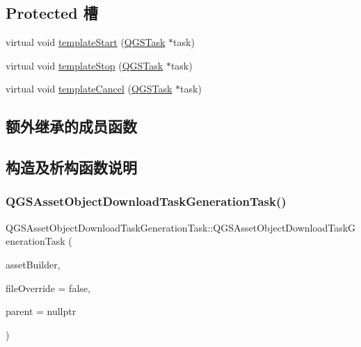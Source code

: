 \subsection*{Protected 槽}
\begin{DoxyCompactItemize}
\item 
virtual void \mbox{\hyperlink{class_q_g_s_asset_object_download_task_generation_task_a87ab572bd8b6f20986871b76418e6d20}{template\+Start}} (\mbox{\hyperlink{class_q_g_s_task}{Q\+G\+S\+Task}} $\ast$task)
\item 
virtual void \mbox{\hyperlink{class_q_g_s_asset_object_download_task_generation_task_ac7c64f2aa05cb50df9a5c50bbc0b5ee7}{template\+Stop}} (\mbox{\hyperlink{class_q_g_s_task}{Q\+G\+S\+Task}} $\ast$task)
\item 
virtual void \mbox{\hyperlink{class_q_g_s_asset_object_download_task_generation_task_a93b38002193f0cb1258de92b6492ce7f}{template\+Cancel}} (\mbox{\hyperlink{class_q_g_s_task}{Q\+G\+S\+Task}} $\ast$task)
\end{DoxyCompactItemize}
\subsection*{额外继承的成员函数}


\subsection{构造及析构函数说明}
\mbox{\label{class_q_g_s_asset_object_download_task_generation_task_a121162585d3d9a6098a1ba98829f5df1}} 
\subsubsection{\texorpdfstring{Q\+G\+S\+Asset\+Object\+Download\+Task\+Generation\+Task()}{QGSAssetObjectDownloadTaskGenerationTask()}\hspace{0.1cm}{\footnotesize\ttfamily [1/3]}}
{\footnotesize\ttfamily Q\+G\+S\+Asset\+Object\+Download\+Task\+Generation\+Task\+::\+Q\+G\+S\+Asset\+Object\+Download\+Task\+Generation\+Task (\begin{DoxyParamCaption}\item[{\mbox{\hyperlink{class_q_g_s_asset_builder}{Q\+G\+S\+Asset\+Builder}} $\ast$}]{asset\+Builder,  }\item[{bool}]{file\+Override = {\ttfamily false},  }\item[{Q\+Object $\ast$}]{parent = {\ttfamily nullptr} }\end{DoxyParamCaption})}

